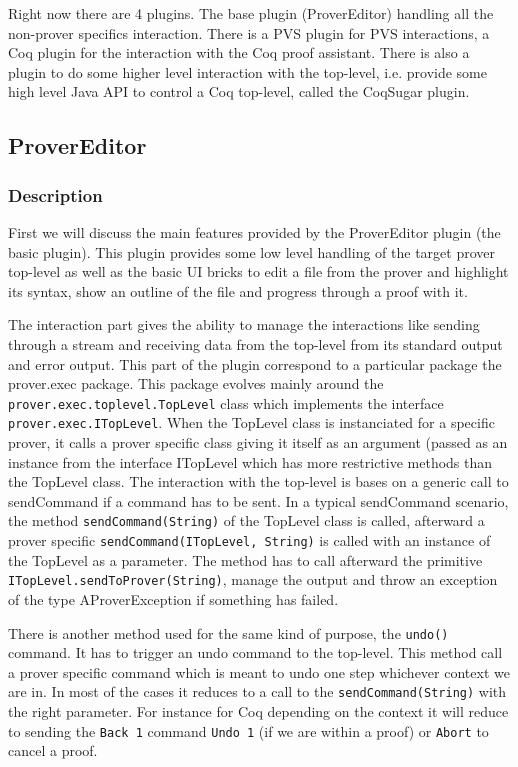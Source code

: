 \documentclass{entcs}
\begin{document}
Right now there are 4 plugins. The base plugin (ProverEditor)
handling all the non-prover specifics interaction. There is a PVS plugin for
PVS interactions, a Coq plugin for the interaction with the Coq proof 
assistant. There is also a plugin to do some higher level interaction 
with the top-level, i.e. provide some high level Java API to control 
a Coq top-level, called the CoqSugar plugin. 
\subsection{ProverEditor}
\subsubsection{Description}
First we will discuss the main features provided by the ProverEditor plugin
(the basic plugin). This plugin provides some low level handling of the target
prover top-level as well as the basic UI bricks to edit a file from the 
prover and highlight its syntax, show an outline of the file and
progress through a proof with it.

The interaction part gives the ability to manage the interactions like sending
through a stream and receiving data from the top-level from its standard output
and error output.
This part of the plugin correspond to a particular package the 
prover.exec package.
This package evolves mainly around the \\
{\tt prover.exec.toplevel.TopLevel} class
which implements the interface {\tt prover.exec.ITopLevel}. 
When the TopLevel class
is instanciated for a specific prover, it calls a prover specific class giving 
it itself as an argument (passed as an instance from the interface
ITopLevel which has more restrictive methods than the TopLevel class.
The interaction with the top-level is bases on a generic call to sendCommand
if a command has to be sent. In a typical sendCommand scenario, the method
{\tt sendCommand(String)} of the TopLevel class is called, 
afterward a prover specific 
{\tt sendCommand(ITopLevel, String)} is called with an instance of the 
TopLevel as a parameter. The method has to call afterward the primitive
{\tt ITopLevel.sendToProver(String)}, manage the output and throw an 
exception of the type AProverException if something has failed.

There is another method used for the same kind of purpose, the
{\tt undo()} command. It has to trigger an undo command to the
top-level. This method call a prover specific  command
which is meant to undo one step whichever context we are in. In most of
the cases it reduces to a call to the {\tt sendCommand(String)} with the 
right parameter.
For instance for Coq depending on the context it will  reduce to 
sending the {\tt Back 1} command {\tt Undo 1}
 (if we are within a proof) or {\tt Abort}
to cancel a proof.
\end{document}

